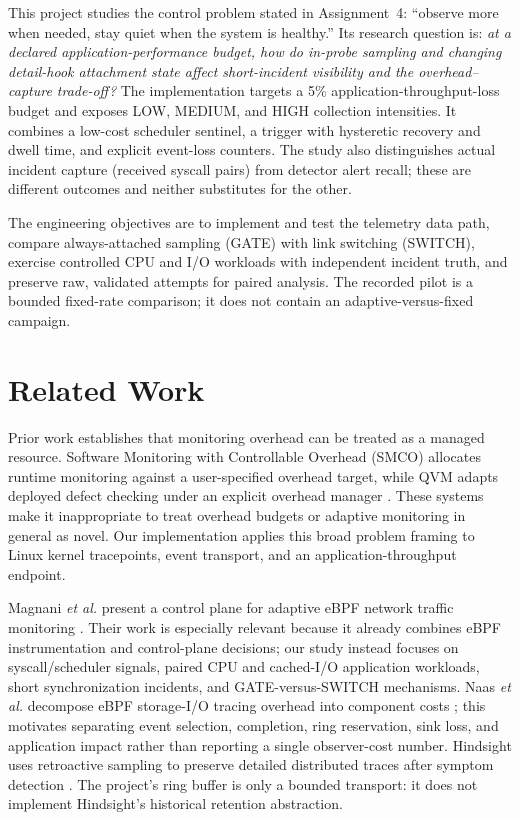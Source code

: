 \documentclass[conference]{IEEEtran}
\begin{document}
This project studies the control problem stated in Assignment~4: ``observe more when needed, stay quiet when the system is healthy.'' Its research question is: \emph{at a declared application-performance budget, how do in-probe sampling and changing detail-hook attachment state affect short-incident visibility and the overhead--capture trade-off?} The implementation targets a 5\% application-throughput-loss budget and exposes LOW, MEDIUM, and HIGH collection intensities. It combines a low-cost scheduler sentinel, a trigger with hysteretic recovery and dwell time, and explicit event-loss counters. The study also distinguishes actual incident capture (received syscall pairs) from detector alert recall; these are different outcomes and neither substitutes for the other.

The engineering objectives are to implement and test the telemetry data path, compare always-attached sampling (GATE) with link switching (SWITCH), exercise controlled CPU and I/O workloads with independent incident truth, and preserve raw, validated attempts for paired analysis. The recorded pilot is a bounded fixed-rate comparison; it does not contain an adaptive-versus-fixed campaign.

\section{Related Work}
Prior work establishes that monitoring overhead can be treated as a managed resource. Software Monitoring with Controllable Overhead (SMCO) allocates runtime monitoring against a user-specified overhead target, while QVM adapts deployed defect checking under an explicit overhead manager \cite{smco,qvm}. These systems make it inappropriate to treat overhead budgets or adaptive monitoring in general as novel. Our implementation applies this broad problem framing to Linux kernel tracepoints, event transport, and an application-throughput endpoint.

Magnani \emph{et al.} present a control plane for adaptive eBPF network traffic monitoring \cite{magnani}. Their work is especially relevant because it already combines eBPF instrumentation and control-plane decisions; our study instead focuses on syscall/scheduler signals, paired CPU and cached-I/O application workloads, short synchronization incidents, and GATE-versus-SWITCH mechanisms. Naas \emph{et al.} decompose eBPF storage-I/O tracing overhead into component costs \cite{naas}; this motivates separating event selection, completion, ring reservation, sink loss, and application impact rather than reporting a single observer-cost number. Hindsight uses retroactive sampling to preserve detailed distributed traces after symptom detection \cite{hindsight}. The project’s ring buffer is only a bounded transport: it does not implement Hindsight’s historical retention abstraction.
\end{document}
